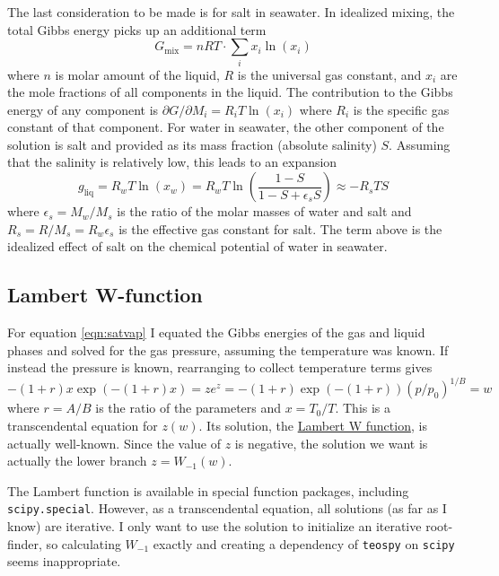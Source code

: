 \documentclass{article}
\newcommand{\liq}{\text{liq}}
\newcommand{\epss}{\epsilon_s}
\begin{document}
The last consideration to be made is for salt in seawater. In idealized mixing, the total Gibbs energy picks up an additional term
\begin{equation*}
    G_{\text{mix}} = n R T \cdot \sum_i x_i \ln(x_i)
\end{equation*}
where $n$ is molar amount of the liquid, $R$ is the universal gas constant, and $x_i$ are the mole fractions of all components in the liquid. The contribution to the Gibbs energy of any component is $\partial G/\partial M_i = R_i T \ln(x_i)$ where $R_i$ is the specific gas constant of that component. For water in seawater, the other component of the solution is salt and provided as its mass fraction (absolute salinity) $S$. Assuming that the salinity is relatively low, this leads to an expansion
\begin{equation*}
    g_{\liq} = R_w T \ln(x_w) = R_w T \ln\left( \frac{1-S}{1-S + \epss S} \right) \approx -R_s T S
\end{equation*}
where $\epss = M_w/M_s$ is the ratio of the molar masses of water and salt and $R_s = R/M_s = R_w \epss$ is the effective gas constant for salt. The term above is the idealized effect of salt on the chemical potential of water in seawater.


\subsection{Lambert W-function}

For equation \ref{eqn:satvap} I equated the Gibbs energies of the gas and liquid phases and solved for the gas pressure, assuming the temperature was known. If instead the pressure is known, rearranging to collect temperature terms gives
\begin{equation*}
    -(1+r) x \exp(-(1+r) x) = z e^z = -(1+r) \exp(-(1+r)) (p/p_0)^{1/B} = w
\end{equation*}
where $r = A/B$ is the ratio of the parameters and $x=T_0/T$. This is a transcendental equation for $z(w)$. Its solution, the \href{https://en.wikipedia.org/wiki/Lambert_W_function}{Lambert W function}, is actually well-known. Since the value of $z$ is negative, the solution we want is actually the lower branch $z = W_{-1}(w)$.

The Lambert function is available in special function packages, including \texttt{scipy.special}. However, as a transcendental equation, all solutions (as far as I know) are iterative. I only want to use the solution to initialize an iterative root-finder, so calculating $W_{-1}$ exactly and creating a dependency of \texttt{teospy} on \texttt{scipy} seems inappropriate.
\end{document}
